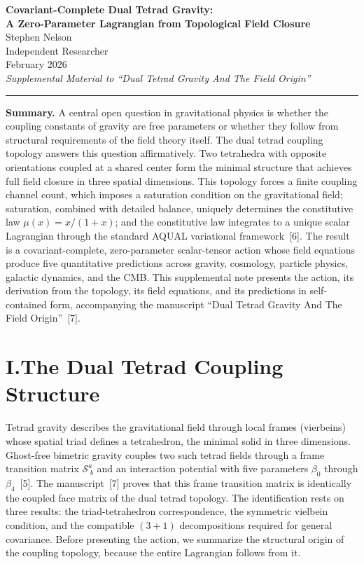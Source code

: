 \documentclass[11pt]{article}
\begin{document}
\begin{center}
{\Large\bfseries Covariant-Complete Dual Tetrad Gravity:\\[4pt] A Zero-Parameter Lagrangian from Topological Field Closure}\\[12pt]
{\normalsize Stephen Nelson}\\
{\small Independent Researcher}\\[8pt]
{\small February 2026}\\[6pt]
{\small\itshape Supplemental Material to ``Dual Tetrad Gravity And The Field Origin''}
\end{center}

\vspace{0.5cm}
\hrule
\vspace{0.5cm}

\textbf{Summary.}\quad
A central open question in gravitational physics is whether the coupling constants of gravity are free parameters or whether they follow from structural requirements of the field theory itself.
The dual tetrad coupling topology answers this question affirmatively.
Two tetrahedra with opposite orientations coupled at a shared center form the minimal structure that achieves full field closure in three spatial dimensions.
This topology forces a finite coupling channel count, which imposes a saturation condition on the gravitational field; saturation, combined with detailed balance, uniquely determines the constitutive law $\mu(x) = x/(1+x)$; and the constitutive law integrates to a unique scalar Lagrangian through the standard AQUAL variational framework~[6].
The result is a covariant-complete, zero-parameter scalar-tensor action whose field equations produce five quantitative predictions across gravity, cosmology, particle physics, galactic dynamics, and the CMB.
This supplemental note presents the action, its derivation from the topology, its field equations, and its predictions in self-contained form, accompanying the manuscript ``Dual Tetrad Gravity And The Field Origin''~[7].

\section*{I.\quad The Dual Tetrad Coupling Structure}

Tetrad gravity describes the gravitational field through local frames (vierbeins) whose spatial triad defines a tetrahedron, the minimal solid in three dimensions.
Ghost-free bimetric gravity couples two such tetrad fields through a frame transition matrix $\mathcal{S}^a_{\;b}$ and an interaction potential with five parameters $\beta_0$ through $\beta_4$~[5].
The manuscript~[7] proves that this frame transition matrix is identically the coupled face matrix of the dual tetrad topology.
The identification rests on three results: the triad-tetrahedron correspondence, the symmetric vielbein condition, and the compatible $(3{+}1)$ decompositions required for general covariance.
Before presenting the action, we summarize the structural origin of the coupling topology, because the entire Lagrangian follows from it.
\end{document}
